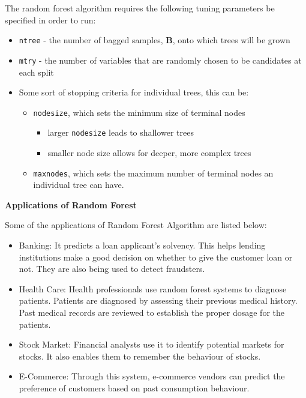 \documentclass[
]{book}
\providecommand{\tightlist}{%
  \setlength{\itemsep}{0pt}\setlength{\parskip}{0pt}}
\begin{document}
The random forest algorithm requires the following tuning parameters be specified in order to run:

\begin{itemize}
\tightlist
\item
  \texttt{ntree} - the number of bagged samples, \(\boldsymbol{B}\), onto which trees will be grown
\item
  \texttt{mtry} - the number of variables that are randomly chosen to be candidates at each split
\item
  Some sort of stopping criteria for individual trees, this can be:

  \begin{itemize}
  \tightlist
  \item
    \texttt{nodesize}, which sets the minimum size of terminal nodes

    \begin{itemize}
    \tightlist
    \item
      larger \texttt{nodesize} leads to shallower trees
    \item
      smaller node size allows for deeper, more complex trees
    \end{itemize}
  \item
    \texttt{maxnodes}, which sets the maximum number of terminal nodes an individual tree can have.
  \end{itemize}
\end{itemize}

\textbf{Applications of Random Forest}

Some of the applications of Random Forest Algorithm are listed below:

\begin{itemize}
\tightlist
\item
  Banking: It predicts a loan applicant's solvency. This helps lending institutions make a good decision on whether to give the customer loan or not. They are also being used to detect fraudsters.
\item
  Health Care: Health professionals use random forest systems to diagnose patients. Patients are diagnosed by assessing their previous medical history. Past medical records are reviewed to establish the proper dosage for the patients.
\item
  Stock Market: Financial analysts use it to identify potential markets for stocks. It also enables them to remember the behaviour of stocks.
\item
  E-Commerce: Through this system, e-commerce vendors can predict the preference of customers based on past consumption behaviour.
\end{itemize}
\end{document}

